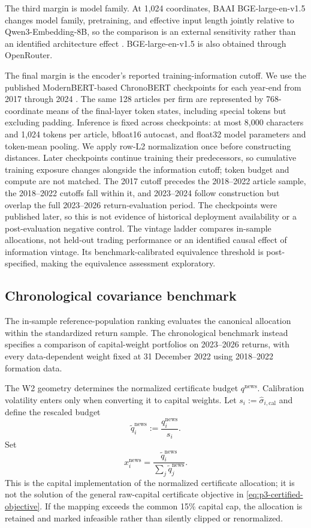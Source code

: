 The third margin is model family.
At 1,024 coordinates, BAAI BGE-large-en-v1.5 changes model family, pretraining,
and effective input length jointly relative to Qwen3-Embedding-8B, so the
comparison is an external sensitivity rather than an identified
architecture effect
\citep{xiao_cpack_2023}.
BGE-large-en-v1.5 is also obtained through OpenRouter.

The final margin is the encoder's reported training-information cutoff.
We use the published ModernBERT-based ChronoBERT checkpoints for each year-end
from 2017 through 2024 \citep{he_chronobert_2025}.
The same 128 articles per firm are represented by 768-coordinate means of the
final-layer token states, including special tokens but excluding padding.
Inference is fixed across checkpoints: at most 8,000 characters and 1,024
tokens per article, bfloat16 autocast, and float32 model parameters and
token-mean pooling.
We apply row-L2 normalization once before constructing distances.
Later checkpoints continue training their predecessors, so cumulative
training exposure changes alongside the information cutoff; token budget
and compute are not matched.
The 2017 cutoff precedes the 2018--2022 article sample, the 2018--2022 cutoffs
fall within it, and 2023--2024 follow construction but overlap the full
2023--2026 return-evaluation period.
The checkpoints were published later, so this is not evidence of historical
deployment availability or a post-evaluation negative control.
The vintage ladder compares in-sample allocations, not held-out trading
performance or an identified causal effect of information vintage.
Its benchmark-calibrated equivalence threshold is post-specified, making the
equivalence assessment exploratory.

\subsection{Chronological covariance benchmark}
\label{sec:p3-covariance-benchmark-design}

The in-sample reference-population ranking evaluates the canonical allocation
within the standardized return sample.
The chronological benchmark instead specifies a comparison of capital-weight
portfolios on 2023--2026 returns, with every data-dependent weight fixed at
31 December 2022 using 2018--2022 formation data.

The W2 geometry determines the normalized certificate budget
$q^{\mathrm{news}}$. Calibration volatility enters only when converting it to
capital weights. Let
$s_i:=\widehat\sigma_{i,\mathrm{cal}}$ and define the rescaled budget
\[
  \widetilde q_i^{\mathrm{news}}
  :=
  \frac{q_i^{\mathrm{news}}}{s_i}.
\]
Set
\[
  x_i^{\mathrm{news}}
  =
  \frac{\widetilde q_i^{\mathrm{news}}}
  {\sum_j \widetilde q_j^{\mathrm{news}}}.
\]
This is the capital implementation of the normalized certificate allocation;
it is not the solution of the general raw-capital certificate objective in
\eqref{eq:p3-certified-objective}. If the mapping exceeds the common 15\%
capital cap, the allocation is retained and marked infeasible rather than
silently clipped or renormalized.

